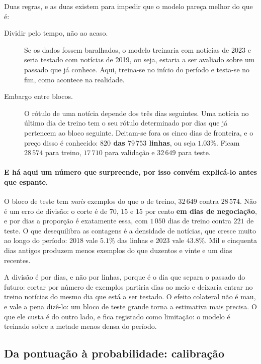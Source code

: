 Duas regras, e as duas existem para impedir que o modelo pareça melhor do que é:

\begin{description}
  \item[Dividir pelo tempo, não ao acaso.] Se os dados fossem baralhados, o modelo treinaria com
        notícias de 2023 e seria testado com notícias de 2019, ou seja, estaria a ser avaliado sobre um
        passado que já conhece. Aqui, treina-se no início do período e testa-se no fim, como
        acontece na realidade.
  \item[Embargo entre blocos.] O rótulo de uma notícia depende dos três dias seguintes. Uma notícia
        no último dia de treino tem o seu rótulo determinado por dias que já pertencem ao bloco
        seguinte. Deitam-se fora os cinco dias de fronteira, e o preço disso é conhecido:
        \textbf{$820$ das $79\,753$ linhas}, ou seja $1.03\%$. Ficam $28\,574$ para treino,
        $17\,710$ para validação e $32\,649$ para teste.
\end{description}

\paragraph{E há aqui um número que surpreende, por isso convém explicá-lo antes que espante.}
O bloco de teste tem \emph{mais} exemplos do que o de treino, $32\,649$ contra $28\,574$. Não é
um erro de divisão: o corte é de $70$, $15$ e $15$ por cento \textbf{em dias de negociação}, e
por dias a proporção é exatamente essa, com $1\,050$ dias de treino contra $221$ de teste. O que
desequilibra as contagens é a densidade de notícias, que cresce muito ao longo do período: 2018
vale $5.1\%$ das linhas e 2023 vale $43.8\%$. Mil e cinquenta dias antigos produzem menos
exemplos do que duzentos e vinte e um dias recentes.

A divisão é por dias, e não por linhas, porque é o dia que separa o passado do futuro: cortar por
número de exemplos partiria dias ao meio e deixaria entrar no treino notícias do mesmo dia que
está a ser testado. O efeito colateral não é mau, e vale a pena dizê-lo: um bloco de teste grande
torna a estimativa mais precisa. O que ele custa é do outro lado, e fica registado como
limitação: o modelo é treinado sobre a metade menos densa do período.

\subsection{Da pontuação à probabilidade: calibração}

